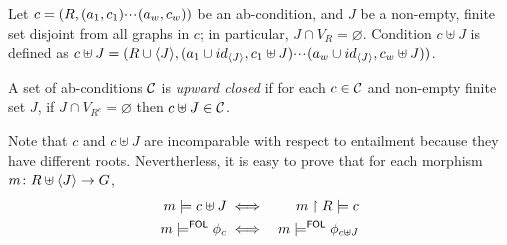 \begin{definition}
  \label{def:adding-nodes-to-condition}
  Let $c = (R,(a_1,c_1){\cdotp\mkern-2mu\cdotp\mkern-2mu\cdotp\mkern1mu} (a_w,c_w))$ be an ab-condition, and $J$ be a non-empty, finite set disjoint from all graphs in $c$; in particular, $J \cap V_R = \varnothing$. Condition $c \uplus J$ is defined as $c \uplus J = (R \cup \langle J \rangle, (a_1 \cup id_{\langle J \rangle}, c_1 \uplus J){\cdotp\mkern-2mu\cdotp\mkern-2mu\cdotp\mkern1mu}(a_w \cup id_{\langle J \rangle}, c_w \uplus J))$. 

  A set of ab-conditions $\mathcal{C}$ is \emph{upward closed} if for each $c \in \mathcal{C}$ and non-empty finite set $J$, if $J \cap V_{R^c} = \varnothing$ then $c \uplus J \in \mathcal{C}$.
\end{definition}

Note that $c$ and $c \uplus J$ are incomparable with respect to entailment because they have different roots. Nevertherless, it is easy to prove that  
for each morphism $m \colon R \uplus \langle J \rangle \rightarrow G$,
\begin{eqnarray}
m \sat c \uplus J & \iff & m \restr R \sat c \eqlabel{eq:modRestricted}\\
m\sat^\FOL \phi_c & \iff & m \sat^\FOL \phi_{c\uplus J} \eqlabel{eq:condExpanded}
\end{eqnarray}

